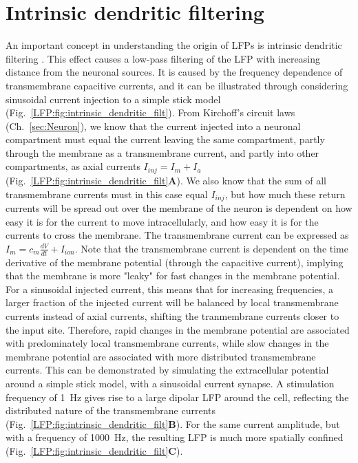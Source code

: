 \section{Intrinsic dendritic filtering}
An important concept in understanding the origin of LFPs is intrinsic
dendritic filtering \cite{Linden2010}. This effect causes a low-pass filtering of the LFP with increasing distance from the neuronal sources.
It is caused by the frequency dependence of transmembrane capacitive currents, and it can be illustrated through considering sinusoidal current injection to a simple stick model (Fig.~\ref{LFP:fig:intrinsic_dendritic_filt}).
From Kirchoff's circuit laws (Ch.~\ref{sec:Neuron}), we know
that the current injected into a neuronal compartment must equal the current leaving the same compartment, partly through the membrane as a transmembrane current, and partly into other compartments, as axial currents $I_{inj} = I_m + I_a$ (Fig.~\ref{LFP:fig:intrinsic_dendritic_filt}{\bf A}). We also know that the sum of all transmembrane currents must in this case equal $I_{inj}$, but how much these return currents will be spread out over the membrane of the neuron is dependent on how easy it is for the current to move intracellularly, and how easy it is for the currents to cross the membrane.
The transmembrane current can be expressed as $I_m = c_m\frac{dV}{dt} + I_{ion}$. Note that the transmembrane current is dependent on the time derivative of the membrane potential (through the capacitive current), implying that the membrane is more "leaky" for fast changes in the membrane potential. For a sinusoidal injected current, %
this means that for increasing frequencies, a larger fraction of the injected current will be balanced by local transmembrane currents instead of axial currents, shifting the tranmembrane currents closer to the input site. 
Therefore, rapid changes in the membrane potential are associated with predominately local transmembrane currents, while slow changes in the membrane potential are associated with more distributed transmembrane currents. This can be demonstrated by simulating the extracellular potential around a simple stick model, with a sinusoidal current synapse. A stimulation frequency of 1~Hz gives rise to a large dipolar LFP around the cell, reflecting the distributed nature of the transmembrane currents (Fig.~\ref{LFP:fig:intrinsic_dendritic_filt}{\bf B}). For the same current amplitude, but with a frequency of 1000~Hz, the resulting LFP is much more spatially confined (Fig.~\ref{LFP:fig:intrinsic_dendritic_filt}{\bf C}).

